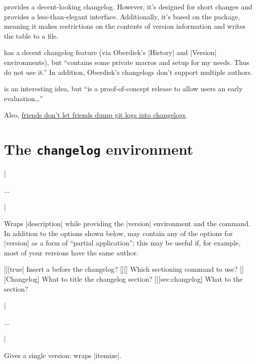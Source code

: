\documentclass{ltxguidex}
\begin{document}
\begin{ctandescription}
	 provides a decent-looking changelog. However, it's
		designed for short changes and provides a less-than-elegant
		interface. Additionally, it's based on the 
		package, meaning it makes restrictions on the contents of
		version information and writes the table to a file.

	 has a decent changelog feature (via
		Oberdiek's |History| and |Version| environments),
		but  ``contains some private macros and setup
		for my needs. Thus do not use it.'' In addition, Oberdiek's
		changelogs don't support multiple authors.

	 is an interesting idea, but  ``is a
		proof-of-concept release to allow users an early
		evaluation\dots''

		Also,
		\href{https://keepachangelog.com/en/1.0.0/}{friends don't
		let friends dump git logs into changelogs}.
\end{ctandescription}

\section{The \texttt{changelog} environment}

\begin{desc}
|\begin{changelog}[<options>]...\end{changelog}|
\end{desc}
Wraps |description| while providing the |version| environment and the
 command. In addition to the options shown below,
 may contain any of the options for |version| as a form of
``partial application''; this may be useful if, for example, most of your
versions have the same author.

\begin{keys}
	[\bool][true]
		Insert a  before the changelog?
	[][]
		Which sectioning command to use?
	[][Changelog]
		What to title the changelog section?
	[][sec:changelog]
		What to  the section?
\end{keys}

\pagebreak
\begin{desc}
|\begin{version}[<options>]...\end{version}|
\end{desc}
Gives a single version; wraps |itemize|.
\end{document}
